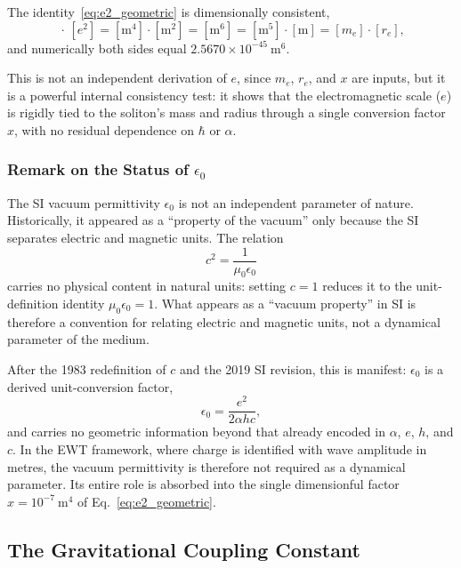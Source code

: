 \documentclass[10pt,a4paper]{article}
\begin{document}
The identity~\eqref{eq:e2_geometric} is dimensionally consistent,
\begin{equation}
	[x]\,\cdot\,[e^2]
	=
	[\text{m}^4]\cdot[\text{m}^2]
	=
	[\text{m}^6]
	=
	[\text{m}^5]\cdot[\text{m}]
	=
	[m_e]\cdot[r_e],
\end{equation}
and numerically both sides equal \(2.5670\times 10^{-45}\ \text{m}^6\).

This is not an independent derivation of \(e\), since \(m_e\), \(r_e\),
and \(x\) are inputs, but it is a powerful internal consistency test:
it shows that the electromagnetic scale (\(e\)) is rigidly tied to the
soliton's mass and radius through a single conversion factor \(x\),
with no residual dependence on \(\hbar\) or \(\alpha\).


\subsubsection*{Remark on the Status of $\epsilon_0$}

The SI vacuum permittivity $\epsilon_0$ is not an independent parameter
of nature. Historically, it appeared as a ``property of the vacuum'' only
because the SI separates electric and magnetic units. The relation
\begin{equation}
	c^2 = \frac{1}{\mu_0 \epsilon_0}
\end{equation}
carries no physical content in natural units: setting $c = 1$ reduces it
to the unit-definition identity $\mu_0 \epsilon_0 = 1$. What appears as a
``vacuum property'' in SI is therefore a convention for relating electric
and magnetic units, not a dynamical parameter of the medium.

After the 1983 redefinition of $c$ and the 2019 SI revision, this is
manifest: $\epsilon_0$ is a derived unit-conversion factor,
\begin{equation}
	\epsilon_0 = \frac{e^2}{2 \alpha h c},
\end{equation}
and carries no geometric information beyond that already encoded in
$\alpha$, $e$, $h$, and $c$. In the EWT framework, where charge is
identified with wave amplitude in metres, the vacuum permittivity is
therefore not required as a dynamical parameter. Its entire role is
absorbed into the single dimensionful factor
$x = 10^{-7}\ \text{m}^4$ of Eq.~\eqref{eq:e2_geometric}.

\subsection{The Gravitational Coupling Constant}
\label{sec:gravitational_coupling}
\end{document}
